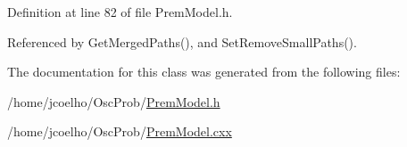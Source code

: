 Definition at line 82 of file Prem\+Model.\+h.



Referenced by Get\+Merged\+Paths(), and Set\+Remove\+Small\+Paths().



The documentation for this class was generated from the following files\+:\begin{DoxyCompactItemize}
\item 
/home/jcoelho/\+Osc\+Prob/\hyperlink{PremModel_8h}{Prem\+Model.\+h}\item 
/home/jcoelho/\+Osc\+Prob/\hyperlink{PremModel_8cxx}{Prem\+Model.\+cxx}\end{DoxyCompactItemize}
